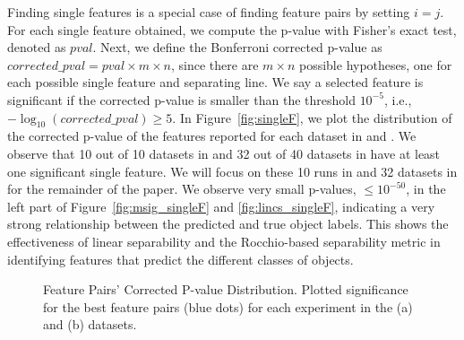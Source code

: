  Finding \topk single features is a special case of finding feature pairs by setting $i=j$. For each single feature obtained, we compute the p-value with Fisher's exact test, denoted as $pval$. Next, we define the Bonferroni corrected p-value as $corrected\_pval= pval\times m \times n$, since there are $m \times n$ possible hypotheses, one for each possible single feature and separating line. We say a selected feature is significant if the corrected p-value is smaller than the threshold $10^{-5}$, i.e., $-\log_{10} (corrected\_pval)\geq5$. In Figure~\ref{fig:singleF}, we plot the distribution of the corrected p-value of the \tophundred features reported for each dataset in \msig and \lincs. We observe that 10 out of 10 datasets in \msig and 32 out of 40 datasets in \lincs have at least one significant single feature. We will focus on these 10 runs in \msig and 32 datasets in \lincs for the remainder of the paper. We observe very small p-values, $\leq 10^{-50}$, in the left part of Figure~\ref{fig:msig_singleF} and \ref{fig:lincs_singleF}, indicating a very strong relationship between the predicted and true object labels. This shows the effectiveness of linear separability and the Rocchio-based separability metric in identifying features that predict the different classes of objects.

%

\begin{figure}[h]
\centering %
\vspace{-5mm}
\vspace{-5mm}
\caption{Feature Pairs' Corrected P-value Distribution. Plotted significance for the \tophundred best feature pairs (blue dots) for each experiment in the (a) \msig and (b) \lincs datasets.}
\vspace{-5mm}
\label{fig:FP}
\end{figure}

